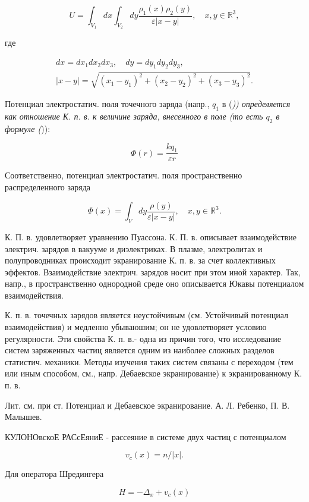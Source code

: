 \documentclass[10pt]{article}
\begin{document}
\[

U=\int_{V_{1}} d x \int_{V_{2}} d y \frac{\rho_{1}(x) \rho_{2}(y)}{\varepsilon|x-y|}, \quad x, y \in \mathbb{R}^{3},

\]



где



\[

\begin{gathered}

d x=d x_{1} d x_{2} d x_{3}, \quad d y=d y_{1} d y_{2} d y_{3}, \\

|x-y|=\sqrt{\left(x_{1}-y_{1}\right)^{2}+\left(x_{2}-y_{2}\right)^{2}+\left(x_{3}-y_{3}\right)^{2}} .

\end{gathered}

\]



Потенциал электростатич. поля точечного заряда (напр., $q_{1}$ в (\textit{)) определяется как отношение К. п. в. к величине заряда, внесенного в поле (то есть $q_{2}$ в формуле (})):



\[

\Phi(r)=\frac{k q_{1}}{\varepsilon r}

\]



Соответственно, потенциал электростатич. поля пространственно распределенного заряда



\[

\Phi(x)=\int_{V} d y \frac{\rho(y)}{\varepsilon|x-y|}, \quad x, y \in \mathbb{R}^{3} .

\]



К. П. в. удовлетворяет уравнению Пуассона. К. П. в. описывает взаимодействие электрич. зарядов в вакууме и диэлектриках. В плазме, электролитах и полупроводниках происходит экранирование К. п. в. за счет коллективных эффектов. Взаимодействие электрич. зарядов носит при этом иной характер. Так, напр., в пространственно однородной среде оно описывается Юкавы потенциалом взаимодействия.



К. п. в. точечных зарядов является неустойчивым (см. Устойчивый потенциал взаимодействия) и медленно убываюшим; он не удовлетворяет условию регулярности. Эти свойства К. п. в.- одна из причин того, что исследование систем заряженных частиц является одним из наиболее сложных разделов статистич. механики. Методы изучения таких систем связаны с переходом (тем или иным способом, см., напр. Дебаевское экранирование) к экранированному К. п. в.



Лит. см. при ст. Потенциал и Дебаевское экранирование. А. Л. Ребенко, П. В. Малышев.



КУЛОНОвскоЕ РАСсЕяниЕ - рассеяние в системе двух частиц с потенциалом



\[

v_{c}(x)=n /|x| .

\]



Для оператора Шредингера



\[

H=-\Delta_{x}+v_{c}(x)

\]
\end{document}
